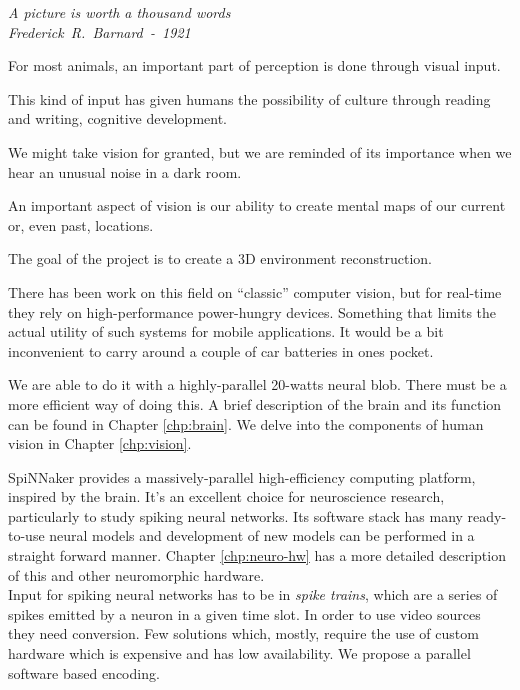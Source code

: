 \begin{flushright}
  \vspace*{2em}
  \large{\emph{A picture is worth a thousand words\\
      Frederick~R.~Barnard~-~1921}}
\end{flushright}

For most animals, an important part of perception is done through visual input.

This kind of input has given humans the possibility of culture through reading and writing, cognitive development.

We might take vision for granted, but we are reminded of its importance when we hear an unusual noise in a dark room. 

An important aspect of vision is our ability to create mental maps of our current or, even past, locations.

The goal of the project is to create a 3D environment reconstruction.

There has been work on this field on ``classic'' computer vision, but for real-time they rely on high-performance power-hungry devices. Something that limits the actual utility of such systems for mobile applications. It would be a bit inconvenient to carry around a couple of car batteries in ones pocket.

We are able to do it with a highly-parallel 20-watts neural blob. There must be a more efficient way of doing this. A brief description of the brain and its function can be found in Chapter \ref{chp:brain}. We delve into the components of human vision in Chapter \ref{chp:vision}.

SpiNNaker provides a massively-parallel high-efficiency computing platform, inspired by the brain. It's an excellent choice for neuroscience research, particularly to study spiking neural networks. Its software stack has many ready-to-use neural models and development of new models can be performed in a straight forward manner. Chapter \ref{chp:neuro-hw} has a more detailed description of this and other neuromorphic hardware.\\


Input for spiking neural networks has to be in \emph{spike trains}, which are a series of spikes emitted by a neuron in a given time slot. In order to use video sources they need conversion. Few solutions which, mostly, require the use of custom hardware which is expensive and has low availability. We propose a parallel software based encoding.

